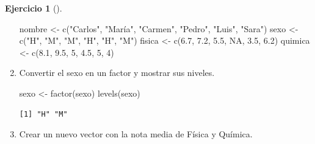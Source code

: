 \documentclass[
  a4paper,
]{scrreport}
\newenvironment{Shaded}{\begin{snugshade}}{\end{snugshade}}
\newcommand{\ConstantTok}[1]{\textcolor[rgb]{0.56,0.35,0.01}{#1}}
\newcommand{\DecValTok}[1]{\textcolor[rgb]{0.68,0.00,0.00}{#1}}
\newcommand{\FloatTok}[1]{\textcolor[rgb]{0.68,0.00,0.00}{#1}}
\newcommand{\FunctionTok}[1]{\textcolor[rgb]{0.28,0.35,0.67}{#1}}
\newcommand{\NormalTok}[1]{\textcolor[rgb]{0.00,0.23,0.31}{#1}}
\newcommand{\OtherTok}[1]{\textcolor[rgb]{0.00,0.23,0.31}{#1}}
\newcommand{\StringTok}[1]{\textcolor[rgb]{0.13,0.47,0.30}{#1}}
\theoremstyle{definition}
\newtheorem{exercise}{Ejercicio}[chapter]
\theoremstyle{definition}
\theoremstyle{remark}
\begin{document}
\begin{exercise}[]
\begin{enumerate}
\begin{tcolorbox}
\begin{Shaded}
\begin{Highlighting}[]
\NormalTok{nombre }\OtherTok{\textless{}{-}} \FunctionTok{c}\NormalTok{(}\StringTok{"Carlos"}\NormalTok{, }\StringTok{"María"}\NormalTok{, }\StringTok{"Carmen"}\NormalTok{, }\StringTok{"Pedro"}\NormalTok{, }\StringTok{"Luis"}\NormalTok{, }\StringTok{"Sara"}\NormalTok{)}
\NormalTok{sexo }\OtherTok{\textless{}{-}} \FunctionTok{c}\NormalTok{(}\StringTok{"H"}\NormalTok{, }\StringTok{"M"}\NormalTok{, }\StringTok{"M"}\NormalTok{, }\StringTok{"H"}\NormalTok{, }\StringTok{"H"}\NormalTok{, }\StringTok{"M"}\NormalTok{)}
\NormalTok{fisica }\OtherTok{\textless{}{-}} \FunctionTok{c}\NormalTok{(}\FloatTok{6.7}\NormalTok{, }\FloatTok{7.2}\NormalTok{, }\FloatTok{5.5}\NormalTok{, }\ConstantTok{NA}\NormalTok{, }\FloatTok{3.5}\NormalTok{, }\FloatTok{6.2}\NormalTok{)}
\NormalTok{quimica }\OtherTok{\textless{}{-}} \FunctionTok{c}\NormalTok{(}\FloatTok{8.1}\NormalTok{, }\FloatTok{9.5}\NormalTok{, }\DecValTok{5}\NormalTok{, }\FloatTok{4.5}\NormalTok{, }\DecValTok{5}\NormalTok{, }\DecValTok{4}\NormalTok{)}
\end{Highlighting}
\end{Shaded}

  \end{tcolorbox}
\item
  Convertir el sexo en un factor y mostrar sus niveles.

  \begin{tcolorbox}[enhanced jigsaw, colbacktitle=quarto-callout-note-color!10!white, breakable, opacitybacktitle=0.6, left=2mm, opacityback=0, leftrule=.75mm, colframe=quarto-callout-note-color-frame, bottomrule=.15mm, toprule=.15mm, toptitle=1mm, colback=white, titlerule=0mm, title=\textcolor{quarto-callout-note-color}{\faInfo}\hspace{0.5em}{Solución}, rightrule=.15mm, arc=.35mm, bottomtitle=1mm, coltitle=black]

\begin{Shaded}
\begin{Highlighting}[]
\NormalTok{sexo }\OtherTok{\textless{}{-}} \FunctionTok{factor}\NormalTok{(sexo)}
\FunctionTok{levels}\NormalTok{(sexo)}
\end{Highlighting}
\end{Shaded}

\begin{verbatim}
[1] "H" "M"
\end{verbatim}

  \end{tcolorbox}
\item
  Crear un nuevo vector con la nota media de Física y Química.


\end{enumerate}
\end{exercise}
\end{document}
